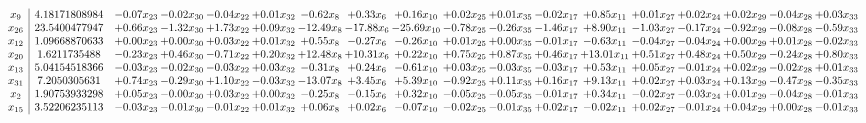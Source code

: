 \documentclass[9pt]{article}
\begin{document}
 \[\begin{array}{c| c c@{\hskip 2pt} c@{\hskip 2pt} c@{\hskip 2pt} c@{\hskip 2pt} c@{\hskip 2pt} c@{\hskip 2pt} c@{\hskip 2pt} c@{\hskip 2pt} c@{\hskip 2pt} c@{\hskip 2pt} c@{\hskip 2pt} c@{\hskip 2pt} c@{\hskip 2pt} c@{\hskip 2pt} c@{\hskip 2pt} c@{\hskip 2pt} }
 x_{9}   &  4.18171808984 & -0.07 x_{23} & -0.02 x_{30} & -0.04 x_{22} & +  0.01 x_{32} & -0.62 x_{8} & +  0.33 x_{6} & +  0.16 x_{10} & +  0.02 x_{25} & +  0.01 x_{35} & -0.02 x_{17} & +  0.85 x_{11} & +  0.01 x_{27} & +  0.02 x_{24} & +  0.02 x_{29} & -0.04 x_{28} & +  0.03 x_{33}\\
 x_{26}   &  23.5400477947 & +  0.66 x_{23} & -1.32 x_{30} & +  1.73 x_{22} & +  0.09 x_{32} & -12.49 x_{8} & -17.88 x_{6} & -25.69 x_{10} & -0.78 x_{25} & -0.26 x_{35} & -1.46 x_{17} & +  8.90 x_{11} & -1.03 x_{27} & -0.17 x_{24} & -0.92 x_{29} & -0.08 x_{28} & -0.59 x_{33}\\
 x_{12}   &  1.09668870633 & +  0.00 x_{23} & +  0.00 x_{30} & +  0.03 x_{22} & +  0.01 x_{32} & +  0.55 x_{8} & -0.27 x_{6} & -0.26 x_{10} & +  0.01 x_{25} & +  0.00 x_{35} & -0.01 x_{17} & -0.63 x_{11} & -0.04 x_{27} & -0.04 x_{24} & +  0.00 x_{29} & +  0.01 x_{28} & -0.02 x_{33}\\
 x_{20}   &  1.6211735488 & -0.23 x_{23} & +  0.46 x_{30} & -0.71 x_{22} & +  0.20 x_{32} & + 12.48 x_{8} & + 10.31 x_{6} & +  0.22 x_{10} & +  0.75 x_{25} & +  0.87 x_{35} & +  0.46 x_{17} & + 13.01 x_{11} & +  0.51 x_{27} & +  0.48 x_{24} & +  0.50 x_{29} & -0.24 x_{28} & +  0.80 x_{33}\\
 x_{13}   &  5.04154518366 & -0.03 x_{23} & -0.02 x_{30} & -0.03 x_{22} & +  0.03 x_{32} & -0.31 x_{8} & +  0.24 x_{6} & -0.61 x_{10} & +  0.03 x_{25} & -0.03 x_{35} & -0.03 x_{17} & +  0.53 x_{11} & +  0.05 x_{27} & -0.01 x_{24} & +  0.02 x_{29} & -0.02 x_{28} & +  0.01 x_{33}\\
 x_{31}   &  7.2050305631 & +  0.74 x_{23} & -0.29 x_{30} & +  1.10 x_{22} & -0.03 x_{32} & -13.07 x_{8} & +  3.45 x_{6} & +  5.39 x_{10} & -0.92 x_{25} & +  0.11 x_{35} & +  0.16 x_{17} & +  9.13 x_{11} & +  0.02 x_{27} & +  0.03 x_{24} & +  0.13 x_{29} & -0.47 x_{28} & -0.35 x_{33}\\
 x_{2}   &  1.90753933298 & +  0.05 x_{23} & -0.00 x_{30} & +  0.03 x_{22} & +  0.00 x_{32} & -0.25 x_{8} & -0.15 x_{6} & +  0.32 x_{10} & -0.05 x_{25} & -0.05 x_{35} & -0.01 x_{17} & +  0.34 x_{11} & -0.02 x_{27} & -0.03 x_{24} & +  0.01 x_{29} & -0.04 x_{28} & -0.01 x_{33}\\
 x_{15}   &  3.52206235113 & -0.03 x_{23} & -0.01 x_{30} & -0.01 x_{22} & +  0.01 x_{32} & +  0.06 x_{8} & +  0.02 x_{6} & -0.07 x_{10} & -0.02 x_{25} & -0.01 x_{35} & +  0.02 x_{17} & -0.02 x_{11} & +  0.02 x_{27} & -0.01 x_{24} & +  0.04 x_{29} & +  0.00 x_{28} & -0.01 x_{33}\\

\end{array}\]
\end{document}
